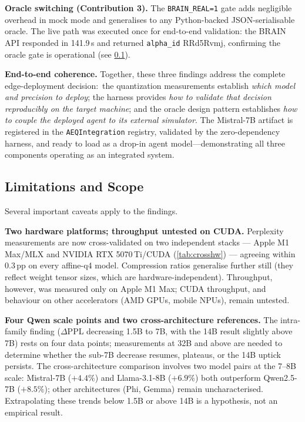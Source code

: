 \documentclass[10pt,twocolumn]{article}
\begin{document}
\textbf{Oracle switching (Contribution 3).}  The \texttt{BRAIN\_REAL=1}
gate adds negligible overhead in mock mode and generalises to any Python-backed
JSON-serialisable oracle.  The live path was executed once for end-to-end
validation: the BRAIN API responded in 141.9\,s and returned \texttt{alpha\_id}
RRd5Rvmj, confirming the oracle gate is operational (see \cref{sec:results:limits}).

\textbf{End-to-end coherence.}  Together, these three findings address the
complete edge-deployment decision:\ the quantization measurements establish
\emph{which model and precision to deploy}; the harness provides \emph{how to
validate that decision reproducibly on the target machine}; and the oracle
design pattern establishes \emph{how to couple the deployed agent to its
external simulator}.  The Mistral-7B artifact is registered in the
\texttt{AEQIntegration} registry, validated by the zero-dependency harness,
and ready to load as a drop-in agent model---demonstrating all three
components operating as an integrated system.

\subsection{Limitations and Scope}
\label{sec:results:limits}

Several important caveats apply to the findings.

\textbf{Two hardware platforms; throughput untested on CUDA.}  Perplexity
measurements are now cross-validated on two independent stacks --- Apple M1
Max/MLX and NVIDIA RTX 5070\,Ti/CUDA (\cref{tab:crosshw}) --- agreeing within
$0.3$\,pp on every affine-q4 model.  Compression ratios generalise further
still (they reflect weight tensor sizes, which are hardware-independent).
Throughput, however, was measured only on Apple M1 Max; CUDA throughput, and
behaviour on other accelerators (AMD GPUs, mobile NPUs), remain untested.

\textbf{Four Qwen scale points and two cross-architecture references.}  The
intra-family finding ($\Delta$PPL decreasing 1.5B to 7B, with the 14B result
slightly above 7B) rests on four data points; measurements at 32B and above are
needed to determine whether the sub-7B decrease resumes, plateaus, or the 14B
uptick persists.  The cross-architecture comparison involves two model pairs at
the 7--8B scale: Mistral-7B ($+4.4\%$) and Llama-3.1-8B ($+6.9\%$) both
outperform Qwen2.5-7B ($+8.5\%$); other architectures (Phi, Gemma) remain
uncharacterised.  Extrapolating these trends below 1.5B or above 14B is
a hypothesis, not an empirical result.
\end{document}
